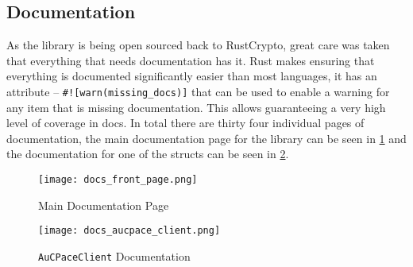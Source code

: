 \subsection{Documentation}
As the library is being open sourced back to RustCrypto, great care was taken that everything that needs documentation has it.
Rust makes ensuring that everything is documented significantly easier than most languages, it has an attribute -- \verb|#![warn(missing_docs)]| that can be used to enable a warning for any item that is missing documentation.
This allows guaranteeing a very high level of coverage in docs.
In total there are thirty four individual pages of documentation, the main documentation page for the library can be seen in \cref{fig:main-doc-page} and the documentation for one of the structs can be seen in \cref{fig:aucpace-client-doc-page}.

\begin{figure}[H]
  \centering

  \texttt{[image: docs\_front\_page.png]}
  \caption{Main Documentation Page}
  \label{fig:main-doc-page}
\end{figure}

\begin{figure}[H]
  \centering

  \texttt{[image: docs\_aucpace\_client.png]}
  \caption{\texttt{AuCPaceClient} Documentation}
  \label{fig:aucpace-client-doc-page}
\end{figure}
